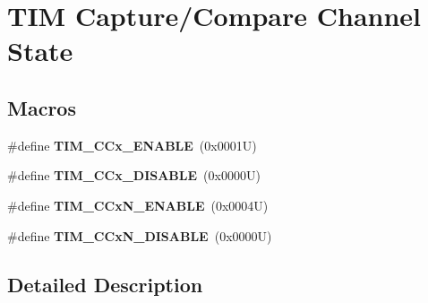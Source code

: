 \hypertarget{group___t_i_m___channel___c_c___state}{}\section{T\+IM Capture/\+Compare Channel State}
\label{group___t_i_m___channel___c_c___state}
\subsection*{Macros}
\begin{DoxyCompactItemize}
\item 
\mbox{\label{group___t_i_m___channel___c_c___state_ga7b214df0d5c67138de7bc84e937909f0}} 
\#define {\bfseries T\+I\+M\+\_\+\+C\+Cx\+\_\+\+E\+N\+A\+B\+LE}~(0x0001\+U)
\item 
\mbox{\label{group___t_i_m___channel___c_c___state_ga5068d16e01778cd3bd09555013b2f4d3}} 
\#define {\bfseries T\+I\+M\+\_\+\+C\+Cx\+\_\+\+D\+I\+S\+A\+B\+LE}~(0x0000\+U)
\item 
\mbox{\label{group___t_i_m___channel___c_c___state_ga69ecb0bf5dcd5ecf30af36d6fc00ea0d}} 
\#define {\bfseries T\+I\+M\+\_\+\+C\+Cx\+N\+\_\+\+E\+N\+A\+B\+LE}~(0x0004\+U)
\item 
\mbox{\label{group___t_i_m___channel___c_c___state_ga241183326d83407f7cc7dbd292533240}} 
\#define {\bfseries T\+I\+M\+\_\+\+C\+Cx\+N\+\_\+\+D\+I\+S\+A\+B\+LE}~(0x0000\+U)
\end{DoxyCompactItemize}


\subsection{Detailed Description}
